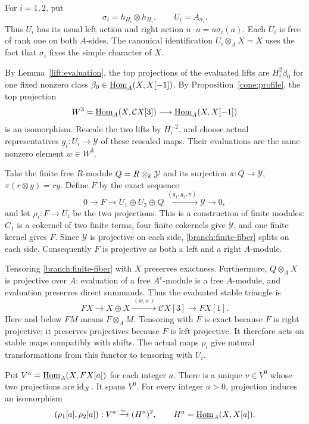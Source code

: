 For $i=1,2$, put
\[
 \sigma_i=h_{H_i}\otimes h_{H_i},\qquad U_i=A_{\sigma_i}.
\]
Thus $U_i$ has its usual left action and right action $u\cdot a=u\sigma_i(a)$.
Each $U_i$ is free of rank one on both $A$-sides.  The canonical
identification $U_i\otimes_A X=X$ uses the fact that $\sigma_i$ fixes the
simple character of $X$.

By Lemma~\ref{lift:evaluation}, the top projections of the evaluated lifts
are $H_i^2\beta_0$ for one fixed nonzero class
$\beta_0\in\underline{\operatorname{Hom}}_{A}(X,X[-1])$.  By
Proposition~\ref{cone:profile}, the top projection
\[
 W^3=\underline{\operatorname{Hom}}_{A}(X,\mathcal C X[3])
 \longrightarrow \underline{\operatorname{Hom}}_{A}(X,X[-1])
\]
is an isomorphism.  Rescale the two lifts by $H_i^{-2}$, and choose actual
representatives $g_i:U_i\to \mathcal Y$ of these rescaled maps.  Their evaluations
are the same nonzero element $w\in W^3$.

Take the finite free $R$-module $Q=R\otimes_{k}\mathcal Y$ and its surjection
$\pi:Q\to \mathcal Y$, $\pi(r\otimes y)=ry$.  Define $F$ by the exact sequence
\begin{equation}
 \label{branch:finite-fiber}
 0\longrightarrow F\longrightarrow U_1\oplus U_2\oplus Q
 \xrightarrow{\ (g_1,g_2,\pi)\ }\mathcal Y\longrightarrow0,
\end{equation}
and let $\rho_i:F\to U_i$ be the two projections.  This is a construction
of finite modules: $C_1$ is a cokernel of two finite terms, four finite
cokernels give $\mathcal Y$, and one finite kernel gives $F$.  Since $\mathcal Y$ is
projective on each side, \eqref{branch:finite-fiber} splits on each side.
Consequently $F$ is projective as both a left and a right $A$-module.

Tensoring \eqref{branch:finite-fiber} with $X$ preserves exactness.
Furthermore, $Q\otimes_AX$ is projective over $A$: evaluation of a free
$A^e$-module is a free $A$-module, and evaluation preserves direct
summands.  Thus the evaluated stable triangle is
\begin{equation}
 \label{branch:evaluated-triangle}
 FX\longrightarrow X\oplus X\xrightarrow{\ (w,w)\ }
 \mathcal C X[3]\longrightarrow FX[1].
\end{equation}
Here and below $FM$ means $F\otimes_AM$.  Tensoring with $F$ is exact
because $F$ is right projective; it preserves projectives because $F$ is
left projective.  It therefore acts on stable maps compatibly with shifts.
The actual maps $\rho_i$ give natural transformations from this functor
to tensoring with $U_i$.

\begin{lemma}
 \label{branch:profile}
 Put $V^a=\underline{\operatorname{Hom}}_{A}(X,FX[a])$ for each integer $a$.  There is a unique
 $v\in V^0$ whose two projections are $\operatorname{id}_X$.  It spans $V^0$.
 For every integer $a>0$, projection induces an isomorphism
 \begin{equation}
  \label{branch:positive-projection}
  (\rho_1[a],\rho_2[a]):V^a\xrightarrow{\sim}
  (H^a)^2,
  \qquad H^a=\underline{\operatorname{Hom}}_{A}(X,X[a]).
 \end{equation}
\end{lemma}

